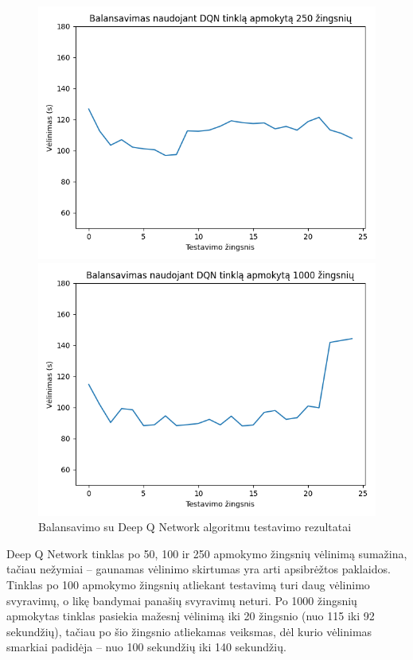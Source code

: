 \documentclass{VUMIFPSbakalaurinis}
\begin{document}
\begin{figure}[H]
\begin{minipage}[b]{0.45\textwidth}
        \includegraphics[width=\textwidth]{img/dqn_250_2.png}
    \end{minipage}
    \hspace{1mm}
    \begin{minipage}[b]{0.45\textwidth}
        \includegraphics[width=\textwidth]{img/dqn_1000_2.png}
    \end{minipage}
    \caption{Balansavimo su Deep Q Network algoritmu testavimo rezultatai}
    \label{dqn–rez}
\end{figure}

Deep Q Network tinklas po 50, 100 ir 250 apmokymo žingsnių vėlinimą sumažina, tačiau nežymiai – gaunamas vėlinimo skirtumas yra arti apsibrėžtos paklaidos. Tinklas po 100 apmokymo žingsnių atliekant testavimą turi daug vėlinimo svyravimų, o likę bandymai panašių svyravimų neturi. Po 1000 žingsnių apmokytas tinklas pasiekia mažesnį vėlinimą iki 20 žingsnio (nuo 115 iki 92 sekundžių), tačiau po šio žingsnio atliekamas veiksmas, dėl kurio vėlinimas smarkiai padidėja – nuo 100 sekundžių iki 140 sekundžių.
\end{document}
